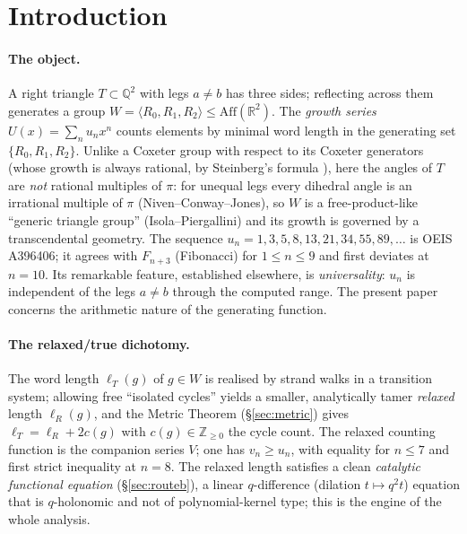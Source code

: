 \documentclass[11pt]{article}
\begin{document}
\tableofcontents
\bigskip

\section{Introduction}\label{sec:intro}

\paragraph{The object.} A right triangle $T\subset\mathbb Q^2$ with legs $a\ne b$ has three
sides; reflecting across them generates a group $W=\langle R_0,R_1,R_2\rangle\le\mathrm{Aff}(\mathbb R^2)$.
The \emph{growth series} $U(x)=\sum_n u_nx^n$ counts elements by minimal word length in the
generating set $\{R_0,R_1,R_2\}$. Unlike a Coxeter group with respect to its Coxeter generators
(whose growth is always rational, by Steinberg's formula \cite{StanleyEC2}), here the angles of
$T$ are \emph{not} rational multiples of $\pi$: for unequal legs every dihedral angle is an
irrational multiple of $\pi$ (Niven--Conway--Jones), so $W$ is a free-product-like ``generic
triangle group'' (Isola--Piergallini) and its growth is governed by a transcendental geometry.
The sequence $u_n=1,3,5,8,13,21,34,55,89,\dots$ is \textup{OEIS A396406}; it agrees with
$F_{n+3}$ (Fibonacci) for $1\le n\le 9$ and first deviates at $n=10$. Its remarkable feature,
established elsewhere, is \emph{universality}: $u_n$ is independent of the legs $a\ne b$ through
the computed range. The present paper concerns the arithmetic nature of the generating function.

\paragraph{The relaxed/true dichotomy.} The word length $\ell_T(g)$ of $g\in W$ is realised by
strand walks in a transition system; allowing free ``isolated cycles'' yields a smaller,
analytically tamer \emph{relaxed} length $\ell_R(g)$, and the Metric Theorem
(\S\ref{sec:metric}) gives $\ell_T=\ell_R+2c(g)$ with $c(g)\in\mathbb Z_{\ge0}$ the cycle count.
The relaxed counting function is the companion series $V$; one has $v_n\ge u_n$, with equality
for $n\le7$ and first strict inequality at $n=8$. The relaxed length satisfies a clean
\emph{catalytic functional equation} (\S\ref{sec:routeb}), a linear $q$-difference (dilation
$t\mapsto q^2t$) equation that is $q$-holonomic and not of polynomial-kernel type; this is the
engine of the whole analysis.
\end{document}
